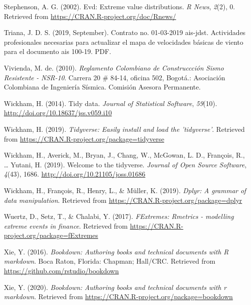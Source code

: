 \documentclass[12pt,oneside]{reedthesis}
\begin{document}
\leavevmode\hypertarget{ref-Stephenson2002}{}%
Stephenson, A. G. (2002). Evd: Extreme value distributions. \emph{R News}, \emph{2}(2), 0. Retrieved from \url{https://CRAN.R-project.org/doc/Rnews/}

\leavevmode\hypertarget{ref-triana2019}{}%
Triana, J. D. S. (2019, September). Contrato no. 01-03-2019 ais-jdst. Actividades profesionales necesarias para actualizar el mapa de velocidades básicas de viento para el documento ais 100-19. PDF.

\leavevmode\hypertarget{ref-nsr10}{}%
Vivienda, M. de. (2010). \emph{Reglamento Colombiano de Construccción Sismo Resistente - NSR-10}. Carrera 20 \# 84-14, oficina 502, Bogotá.: Asociación Colombiana de Ingeniería Sísmica. Comisión Asesora Permanente.

\leavevmode\hypertarget{ref-Wickham2014}{}%
Wickham, H. (2014). Tidy data. \emph{Journal of Statistical Software}, \emph{59}(10). \url{http://doi.org/10.18637/jss.v059.i10}

\leavevmode\hypertarget{ref-Wickham2019a}{}%
Wickham, H. (2019). \emph{Tidyverse: Easily install and load the 'tidyverse'}. Retrieved from \url{https://CRAN.R-project.org/package=tidyverse}

\leavevmode\hypertarget{ref-Wickham2019b}{}%
Wickham, H., Averick, M., Bryan, J., Chang, W., McGowan, L. D., François, R., \ldots{} Yutani, H. (2019). Welcome to the tidyverse. \emph{Journal of Open Source Software}, \emph{4}(43), 1686. \url{http://doi.org/10.21105/joss.01686}

\leavevmode\hypertarget{ref-Wickham2019}{}%
Wickham, H., François, R., Henry, L., \& Müller, K. (2019). \emph{Dplyr: A grammar of data manipulation}. Retrieved from \url{https://CRAN.R-project.org/package=dplyr}

\leavevmode\hypertarget{ref-Wuertz2017}{}%
Wuertz, D., Setz, T., \& Chalabi, Y. (2017). \emph{FExtremes: Rmetrics - modelling extreme events in finance}. Retrieved from \url{https://CRAN.R-project.org/package=fExtremes}

\leavevmode\hypertarget{ref-Xie2016}{}%
Xie, Y. (2016). \emph{Bookdown: Authoring books and technical documents with R markdown}. Boca Raton, Florida: Chapman; Hall/CRC. Retrieved from \url{https://github.com/rstudio/bookdown}

\leavevmode\hypertarget{ref-Xie2020}{}%
Xie, Y. (2020). \emph{Bookdown: Authoring books and technical documents with r markdown}. Retrieved from \url{https://CRAN.R-project.org/package=bookdown}

\noindent
\end{document}
